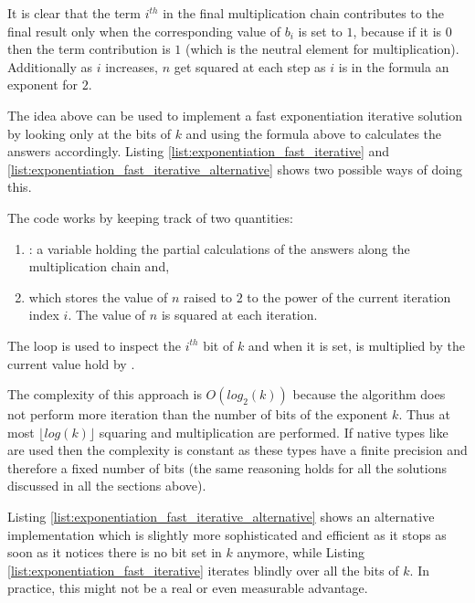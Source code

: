 It is clear that the term $i^{th}$ in the final multiplication chain contributes to the final result only when the corresponding value of $b_i$ is set to $1$, because if it is $0$ then the term contribution is $1$ (which is the neutral element for multiplication).
Additionally as $i$ increases, $n$ get squared at each step as $i$ is in the formula an exponent for $2$. 


The idea above can be used to implement
a fast exponentiation iterative solution by looking only at the bits of $k$ and using the formula above to calculates the answers accordingly. 
Listing \ref{list:exponentiation_fast_iterative} and \ref{list:exponentiation_fast_iterative_alternative} shows two  possible ways of doing this.




The code works by keeping track of two quantities:
\begin{enumerate}
    \item {}: a variable holding the partial calculations of the answers along the multiplication chain and, 
    \item {} which stores the value of $n$ raised to $2$ to the power of the current iteration index $i$. The value of $n$ is squared at each iteration.
\end{enumerate}
The loop is used to inspect the $i^{th}$ bit of $k$ and when it is set,  is multiplied by the current value hold by . 


The complexity of this approach is $O(log_2(k))$ because the algorithm does not perform more
iteration than the number of bits of the exponent $k$. Thus at most $\lfloor log(k) \rfloor$ squaring and
multiplication are performed. If native types like  are used then the complexity is constant as these types have a finite precision and therefore a fixed number of bits (the same reasoning holds for all the solutions discussed in all the sections above). 

Listing \ref{list:exponentiation_fast_iterative_alternative} shows an alternative implementation which is slightly more sophisticated and efficient as it stops  as soon as it notices there is no bit set in $k$ anymore,  while Listing \ref{list:exponentiation_fast_iterative} iterates blindly over all the bits of $k$. 
In practice, this might not be a real or even measurable advantage.


